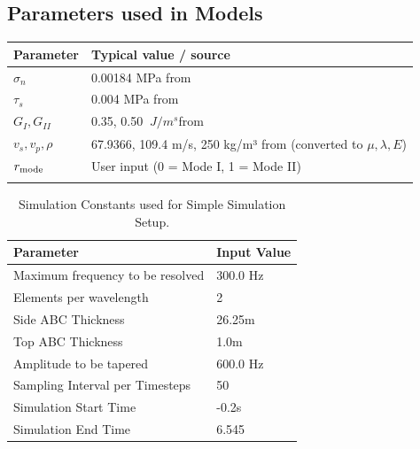 \begin{appendices}

\chapter{Parameters used in Models}
\label{app:C}

\begin{center}
\begin{tabular}{ll}
\hline
Parameter & Typical value / source \\
\hline
$\sigma_n$ & 0.00184 MPa from \cite{mahajanModelingInterfacialCrack2008} \\
$\tau_s$ & 0.004 MPa from \cite{mahajanModelingInterfacialCrack2008} \\
$G_I, G_{II}$ & 0.35, 0.50 $\ J/m^s$from \cite{mahajanModelingInterfacialCrack2008} \\
$v_s, v_p, \rho$ & 67.9366, 109.4 m/s, 250 kg/m³ from \cite{trottetTransitionSubRayleighAnticrack2022} (converted to $\mu,\lambda,E$) \\
$r_{\rm mode}$ & User input (0 = Mode I, 1 = Mode II) \\
\hline
\caption{Parameters used in the simple simulations.}
\label{tab:simple_params}
\end{tabular}
\end{center}

\begin{table}[h]
\begin{tabular}{|l|l|}
\hline
Parameter                        & Input Value \\ \hline
Maximum frequency to be resolved & 300.0 Hz    \\ \hline
Elements per wavelength          & 2           \\ \hline
Side ABC Thickness               & 26.25m      \\ \hline
Top ABC Thickness                & 1.0m        \\ \hline
Amplitude to be tapered          & 600.0 Hz    \\ \hline
Sampling Interval per Timesteps  & 50         \\ \hline
Simulation Start Time            & -0.2s      \\ \hline
Simulation End Time              & 6.545      \\ \hline
\end{tabular}
\caption{Simulation Constants used for Simple Simulation Setup.}
\label{tab:simple_sim_param}
\end{table}


\end{appendices}
